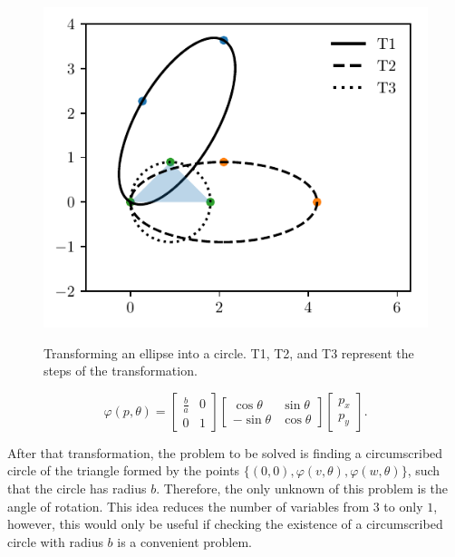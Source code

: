 \begin{figure}
	\centering
	\caption{Transforming an ellipse into a circle. T1, T2, and T3 represent the steps of the transformation.}
	\includegraphics{tex/figures/scripts/circumscribed-circle}
	\fautor
	\label{fig:circumscribed-circle}
\end{figure}
\begin{equation}\label{eq:trpnts}
\varphi(p, \theta)=\left[\begin{array}{cc}
\frac{b}{a}&0\\
0&1
\end{array}\right]
\left[\begin{array}{cc}
\cos{\theta}&\sin{\theta}\\
-\sin{\theta}&\cos{\theta}
\end{array}\right]\left[\begin{array}{c}
p_x\\
p_y
\end{array}\right].
\end{equation}

After that transformation, the problem to be solved is finding a circumscribed circle of the triangle formed by the points $\{(0, 0), \varphi(v, \theta),\varphi(w, \theta)\}$, such that the circle has radius $b$. Therefore, the only unknown of this problem is the angle of rotation. This idea reduces the number of variables from $3$ to only $1$, however, this would only be useful if checking the existence of a circumscribed circle with radius $b$ is a convenient problem.

